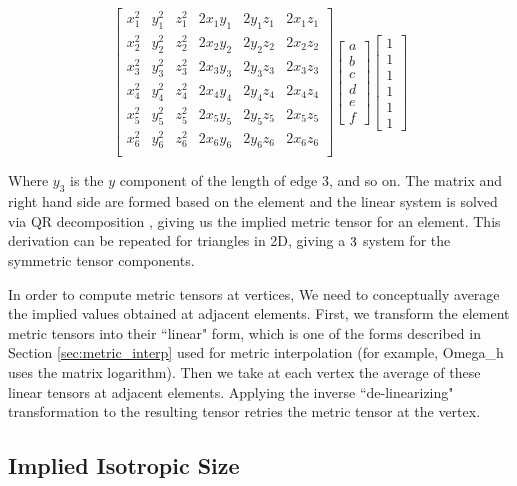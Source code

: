 \begin{equation}
\begin{bmatrix}
x_1^2 & y_1^2 & z_1^2 & 2x_1y_1 & 2y_1z_1 & 2x_1z_1 \\
x_2^2 & y_2^2 & z_2^2 & 2x_2y_2 & 2y_2z_2 & 2x_2z_2 \\
x_3^2 & y_3^2 & z_3^2 & 2x_3y_3 & 2y_3z_3 & 2x_3z_3 \\
x_4^2 & y_4^2 & z_4^2 & 2x_4y_4 & 2y_4z_4 & 2x_4z_4 \\
x_5^2 & y_5^2 & z_5^2 & 2x_5y_5 & 2y_5z_5 & 2x_5z_5 \\
x_6^2 & y_6^2 & z_6^2 & 2x_6y_6 & 2y_6z_6 & 2x_6z_6 \\
\end{bmatrix}
\begin{bmatrix}
a \\ b \\ c \\ d \\ e \\ f
\end{bmatrix}
\begin{bmatrix}
1 \\ 1 \\ 1 \\ 1 \\ 1 \\ 1
\end{bmatrix}
\end{equation}

Where $y_3$ is the $y$ component of the length of edge 3,
and so on.
The matrix and right hand side are formed based on the element
and the linear system is solved via QR decomposition
\cite{trefethen1997numerical}, giving us
the implied metric tensor for an element.
This derivation can be repeated for triangles in 2D, giving
a $3\time 3$ system for the symmetric tensor components.

In order to compute metric tensors at vertices,
We need to conceptually average the implied values obtained
at adjacent elements.
First, we transform the element metric tensors into their
``linear" form, which is one of the forms described
in Section \ref{sec:metric_interp} used for metric interpolation
(for example, Omega\_h uses the matrix logarithm).
Then we take at each vertex the average of these linear
tensors at adjacent elements.
Applying the inverse ``de-linearizing" transformation to the resulting tensor
retries the metric tensor at the vertex.

\subsection{Implied Isotropic Size}
\label{sec:ident_size}


